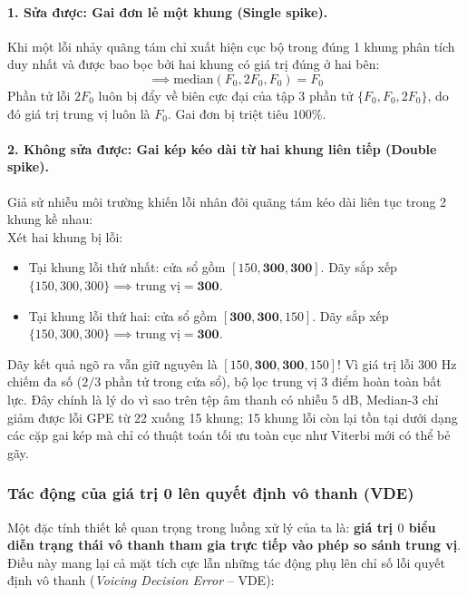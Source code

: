 \paragraph{1. Sửa được: Gai đơn lẻ một khung (Single spike).}
Khi một lỗi nhảy quãng tám chỉ xuất hiện cục bộ trong đúng 1 khung phân tích duy nhất và được bao bọc bởi hai khung có giá trị đúng ở hai bên:
\begin{equation}
    [\dots, F_0, \mathbf{2F_0}, F_0, \dots] \implies \text{median}(F_0, 2F_0, F_0) = F_0
\end{equation}
Phần tử lỗi $2F_0$ luôn bị đẩy về biên cực đại của tập 3 phần tử $\{F_0, F_0, 2F_0\}$, do đó giá trị trung vị luôn là $F_0$. Gai đơn bị triệt tiêu $100\%$.

\paragraph{2. Không sửa được: Gai kép kéo dài từ hai khung liên tiếp (Double spike).}
Giả sử nhiễu môi trường khiến lỗi nhân đôi quãng tám kéo dài liên tục trong 2 khung kề nhau:
\begin{equation}
    [\dots, 150, \mathbf{300, 300}, 150, \dots]
\end{equation}
Xét hai khung bị lỗi:
\begin{itemize}
    \item Tại khung lỗi thứ nhất: cửa sổ gồm $[150, \mathbf{300, 300}]$. Dãy sắp xếp $\{150, 300, 300\} \implies \text{trung vị} = \mathbf{300}$.
    \item Tại khung lỗi thứ hai: cửa sổ gồm $[\mathbf{300, 300}, 150]$. Dãy sắp xếp $\{150, 300, 300\} \implies \text{trung vị} = \mathbf{300}$.
\end{itemize}
Dãy kết quả ngõ ra vẫn giữ nguyên là $[150, \mathbf{300, 300}, 150]$!
Vì giá trị lỗi $300\text{ Hz}$ chiếm đa số ($2 / 3$ phần tử trong cửa sổ), bộ lọc trung vị 3 điểm hoàn toàn bất lực. Đây chính là lý do vì sao trên tệp âm thanh có nhiễu $5\text{ dB}$, Median-3 chỉ giảm được lỗi GPE từ 22 xuống 15 khung; 15 khung lỗi còn lại tồn tại dưới dạng các cặp gai kép mà chỉ có thuật toán tối ưu toàn cục như Viterbi mới có thể bẻ gãy.

\subsubsection*{Tác động của giá trị 0 lên quyết định vô thanh (VDE)}
Một đặc tính thiết kế quan trọng trong luồng xử lý của ta là: \textbf{giá trị $0$ biểu diễn trạng thái vô thanh tham gia trực tiếp vào phép so sánh trung vị}. Điều này mang lại cả mặt tích cực lẫn những tác động phụ lên chỉ số lỗi quyết định vô thanh (\emph{Voicing Decision Error} -- VDE):

